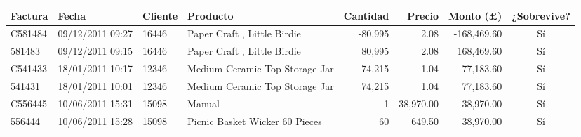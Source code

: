 \begin{tabular}{llllrrrc}
\toprule
Factura & Fecha & Cliente & Producto & Cantidad & Precio & Monto (\pounds) & ¿Sobrevive? \\
\midrule
C581484 & 09/12/2011 09:27 & 16446 & Paper Craft , Little Birdie & -80,995 & 2.08 & -168,469.60 & Sí \\
581483 & 09/12/2011 09:15 & 16446 & Paper Craft , Little Birdie & 80,995 & 2.08 & 168,469.60 & Sí \\
C541433 & 18/01/2011 10:17 & 12346 & Medium Ceramic Top Storage Jar & -74,215 & 1.04 & -77,183.60 & Sí \\
541431 & 18/01/2011 10:01 & 12346 & Medium Ceramic Top Storage Jar & 74,215 & 1.04 & 77,183.60 & Sí \\
C556445 & 10/06/2011 15:31 & 15098 & Manual & -1 & 38,970.00 & -38,970.00 & Sí \\
556444 & 10/06/2011 15:28 & 15098 & Picnic Basket Wicker 60 Pieces & 60 & 649.50 & 38,970.00 & Sí \\
\bottomrule
\end{tabular}
